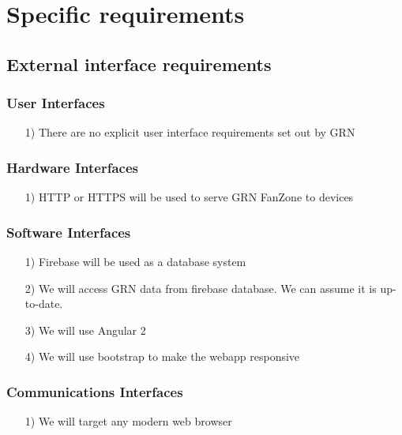 \documentclass[10pt,a4paper]{article}
\begin{document}
\newpage
\section{Specific requirements}
\subsection{External interface requirements}

\subsubsection{User Interfaces}
\begin{itemize}
\item[1)]
There are no explicit user interface requirements set out by GRN
\end{itemize}

\subsubsection{Hardware Interfaces}
\begin{itemize}
\item[1)]
HTTP or HTTPS will be used to serve GRN FanZone to devices
\end{itemize}

\subsubsection{Software Interfaces}
\begin{itemize}
\item[1)]
Firebase will be used as a database system

\item[2)]
We will access GRN data from firebase database. We can assume it is up-to-date.


\item[3)]
We will use Angular 2

\item[4)]
We will use bootstrap to make the webapp responsive
\end{itemize}

\subsubsection{Communications Interfaces}
\begin{itemize}
\item[1)]
We will target any modern web browser 
\end{itemize}
\end{document}
